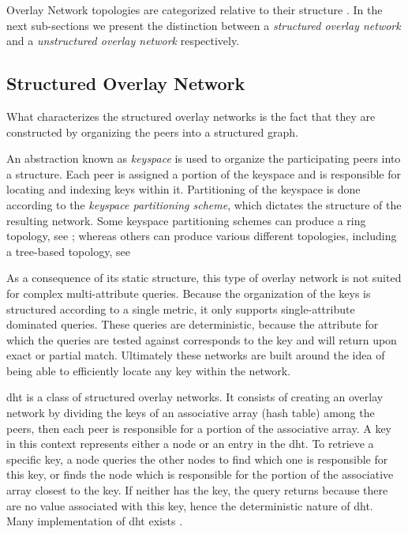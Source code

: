 \documentclass[12pt, titlepage]{uo_temp}
\begin{document}
     Overlay Network topologies are categorized relative to their structure
     \cite{lua2005survey}. In the next sub-sections we present the distinction between a
     \emph{structured overlay network} and a \emph{unstructured overlay network} respectively.

     \subsection{Structured Overlay Network}
     What characterizes the structured overlay networks is the fact that they are constructed
     by organizing the peers into a structured graph.

     An abstraction known as \emph{keyspace} is used to organize the participating peers
     into a structure. Each peer is assigned a portion of the keyspace and is responsible
     for locating and indexing keys within it. Partitioning of the keyspace is done according
     to the \emph{keyspace partitioning scheme}, which dictates the structure of the
     resulting network. Some keyspace partitioning schemes can produce a ring topology,
     see \cite{stoica2001chord}; whereas others can produce various different topologies,
     including a tree-based topology, see \cite{jagadish2005baton}

     As a consequence of its static structure, this type of overlay network is not suited
     for complex multi-attribute queries. Because the organization of the keys is
     structured according to a single metric, it only supports single-attribute dominated
     queries. These queries are deterministic, because the attribute for which the queries
     are tested against corresponds to the key and will return upon exact or partial
     match. Ultimately these networks are built around the idea of being able to
     efficiently locate any key within the network.

     \gls{dht} is a class of structured overlay networks. It consists of creating an
     overlay network by dividing the keys of an associative array (hash table) among the
     peers, then each peer is responsible for a portion of the associative array. A key in
     this context represents either a node or an entry in the \gls{dht}. To retrieve a
     specific key, a node queries the other nodes to find which one is responsible for
     this key, or finds the node which is responsible for the portion of the associative
     array closest to the key. If neither has the key, the query returns because there are
     no value associated with this key, hence the deterministic nature of \gls{dht}.  Many
     implementation of \gls{dht} exists \cite{sarmady2010survey} \cite{lua2005survey}
     \cite{p2p_collab}.
\end{document}
